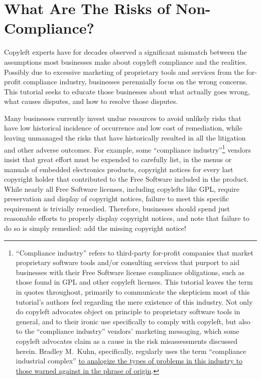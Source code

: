 \section{What Are The Risks of Non-Compliance?}

Copyleft experts have for decades observed a significant mismatch between the
assumptions most businesses make about copyleft compliance and the realities.
Possibly due to excessive marketing of proprietary tools and services from
the for-profit compliance industry, businesses perennially focus on the wrong
concerns.  This tutorial seeks to educate those businesses about what
actually goes wrong, what causes disputes, and how to resolve those disputes.

Many businesses currently invest undue resources to avoid unlikely risks that
have low historical incidence of occurrence and low cost of remediation,
while leaving unmanaged the risks that have historically resulted in all the
litigation and other adverse outcomes.  For example, some ``compliance
industry''\footnote{``Compliance industry'' refers to third-party for-profit
  companies that market proprietary software tools and/or consulting services
  that purport to aid businesses with their Free Software license compliance
  obligations, such as those found in GPL and other copyleft licenses.  This
  tutorial leaves the term in quotes throughout, primarily to communicate the
  skepticism most of this tutorial's authors feel regarding the mere
  existence of this industry.  Not only do copyleft advocates object on
  principle to proprietary software tools in general, and to their ironic use
  specifically to comply with copyleft, but also to the ``compliance
  industry'' vendors' marketing messaging, which some copyleft advocates
  claim as a cause in the risk misassessments discussed herein.  Bradley
  M.~Kuhn, specifically, regularly uses the term ``compliance industrial
  complex''
  \href{http://en.wikipedia.org/wiki/Military-industrial_complex}{to
    analogize the types of problems in this industry to those warned against
    in the phrase of origin}.} vendors insist that great effort must be
expended to carefully list, in the menus or manuals of embedded electronics
products, copyright notices for every last copyright holder that contributed
to the Free Software included in the product.  While nearly all Free Software
licenses, including copylefts like GPL, require preservation and display of
copyright notices, failure to meet this specific requirement is trivially
remedied.  Therefore, businesses should spend just reasonable efforts to
properly display copyright notices, and note that failure to do so is simply
remedied: add the missing copyright notice!

